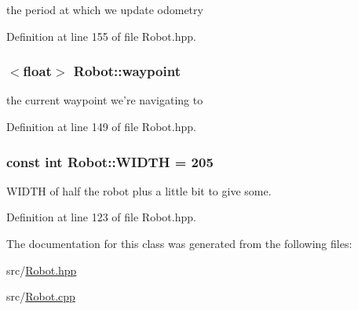 the period at which we update odometry 



Definition at line 155 of file Robot.\-hpp.

\hypertarget{classRobot_a4e7ca1c81831d252aa1545f549bff3f4}{
\subsubsection[{waypoint}]{$<$float$>$ Robot\-::waypoint\hspace{0.3cm}{\ttfamily [private]}}}\label{classRobot_a4e7ca1c81831d252aa1545f549bff3f4}


the current waypoint we're navigating to 



Definition at line 149 of file Robot.\-hpp.

\hypertarget{classRobot_aeefc61d76e6ba024e4af9c844715a84d}{
\subsubsection[{W\-I\-D\-T\-H}]{\setlength{\rightskip}{0pt plus 5cm}const int Robot\-::\-W\-I\-D\-T\-H = 205\hspace{0.3cm}{\ttfamily [static]}}}\label{classRobot_aeefc61d76e6ba024e4af9c844715a84d}


W\-I\-D\-T\-H of half the robot plus a little bit to give some. 



Definition at line 123 of file Robot.\-hpp.



The documentation for this class was generated from the following files\-:\begin{DoxyCompactItemize}
\item 
src/\hyperlink{Robot_8hpp}{Robot.\-hpp}\item 
src/\hyperlink{Robot_8cpp}{Robot.\-cpp}\end{DoxyCompactItemize}

